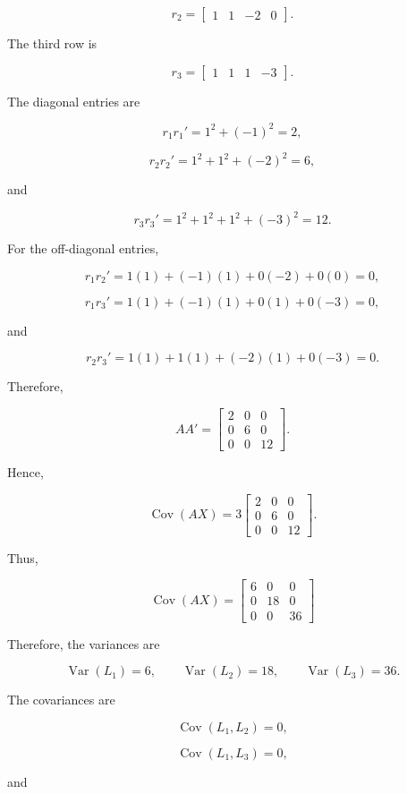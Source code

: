 \documentclass[12pt]{article}
\begin{document}
\[
r_2=
\begin{bmatrix}
1&1&-2&0
\end{bmatrix}.
\]

The third row is

\[
r_3=
\begin{bmatrix}
1&1&1&-3
\end{bmatrix}.
\]

The diagonal entries are

\[
r_1r_1'
=
1^2+(-1)^2
=
2,
\]

\[
r_2r_2'
=
1^2+1^2+(-2)^2
=
6,
\]

and

\[
r_3r_3'
=
1^2+1^2+1^2+(-3)^2
=
12.
\]

For the off-diagonal entries,

\[
r_1r_2'
=
1(1)+(-1)(1)+0(-2)+0(0)
=
0,
\]

\[
r_1r_3'
=
1(1)+(-1)(1)+0(1)+0(-3)
=
0,
\]

and

\[
r_2r_3'
=
1(1)+1(1)+(-2)(1)+0(-3)
=
0.
\]

Therefore,

\[
AA'
=
\begin{bmatrix}
2&0&0\\
0&6&0\\
0&0&12
\end{bmatrix}.
\]

Hence,

\[
\operatorname{Cov}(AX)
=
3
\begin{bmatrix}
2&0&0\\
0&6&0\\
0&0&12
\end{bmatrix}.
\]

Thus,

\[
\boxed{
\operatorname{Cov}(AX)
=
\begin{bmatrix}
6&0&0\\
0&18&0\\
0&0&36
\end{bmatrix}}
\]

Therefore, the variances are

\[
\boxed{
\operatorname{Var}(L_1)=6,
\qquad
\operatorname{Var}(L_2)=18,
\qquad
\operatorname{Var}(L_3)=36.
}
\]

The covariances are

\[
\boxed{
\operatorname{Cov}(L_1,L_2)=0,
}
\]

\[
\boxed{
\operatorname{Cov}(L_1,L_3)=0,
}
\]

and
\end{document}
